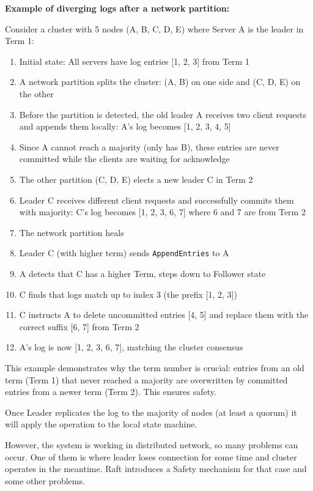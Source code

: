 \documentclass[shortabstract]{iithesis}
\begin{document}
\textbf{Example of diverging logs after a network partition:}

Consider a cluster with 5 nodes (A, B, C, D, E) where Server A is the leader in Term 1:
\begin{enumerate}
    \item Initial state: All servers have log entries [1, 2, 3] from Term 1
    \item A network partition splits the cluster: (A, B) on one side and (C, D, E) on the other
    \item Before the partition is detected, the old leader A receives two client requests and appends them locally: A's log becomes [1, 2, 3, 4, 5]
    \item Since A cannot reach a majority (only has B), these entries are never committed while the clients are waiting for acknowledge
    \item The other partition (C, D, E) elects a new leader C in Term 2
    \item Leader C receives different client requests and successfully commits them with majority: C's log becomes [1, 2, 3, 6, 7] where 6 and 7 are from Term 2
    \item The network partition heals
    \item Leader C (with higher term) sends \texttt{AppendEntries} to A
    \item A detects that C has a higher Term, steps down to Follower state
    \item C finds that logs match up to index 3 (the prefix [1, 2, 3])
    \item C instructs A to delete uncommitted entries [4, 5] and replace them with the correct suffix [6, 7] from Term 2
    \item A's log is now [1, 2, 3, 6, 7], matching the cluster consensus
\end{enumerate}

This example demonstrates why the term number is crucial: entries from an old term (Term 1) that never reached a majority are overwritten by committed entries from a newer term (Term 2). This ensures safety. 

Once Leader replicates the log to the majority of nodes (at least a quorum) it will apply the operation to the local state machine.

However, the system is working in distributed network, so many problems can occur. One of them is where leader loses connection for some time and cluster operates in the meantime. Raft introduces a Safety mechanism for that case and some other problems.
\end{document}
